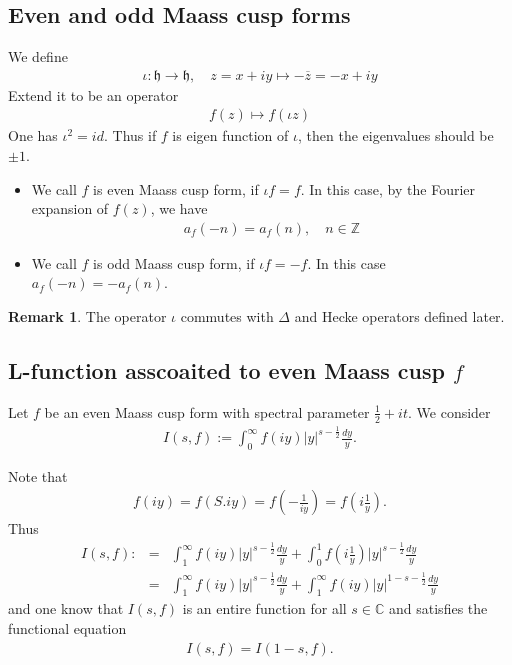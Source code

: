 \documentclass[11pt,reqno]{amsart}
\newcommand{\bna}{\begin{eqnarray*}}
\newcommand{\ena}{\end{eqnarray*}}
\newcommand{\mk}{\mathfrak}
\def\C{\mathbb{C}}
\def\Z{\mathbb{Z}}
\theoremstyle{definition}
\newtheorem{remark}{Remark}
\newcommand{\bit}{\begin{itemize}}
\newcommand{\eit}{\end{itemize}}
\begin{document}
\subsection{Even and odd Maass cusp forms}
We define
\bna
\iota:\mk h\rightarrow \mk  h,\quad z=x+iy\mapsto -\overline{z}=-x+iy
\ena
Extend it to be an operator
\bna
f(z)\mapsto f(\iota z)
\ena
One has $\iota^2=id$. Thus if $f$ is eigen function of $\iota$, then the eigenvalues
should be $\pm 1$.
\bit
\item We call $f$ is even Maass cusp form, if $\iota f=f$.
In this case, by the Fourier expansion of $f(z)$, we have
\bna
a_f(-n)=a_f(n),\quad n\in \Z
\ena
\item We call $f$ is odd Maass cusp form, if $\iota f=-f$.
In this case $a_f(-n)=-a_f(n)$.
\eit
\begin{remark}
The operator $\iota$ commutes with $\Delta$ and Hecke operators defined later.
\end{remark}
\subsection{L-function asscoaited to even Maass cusp $f$}
Let $f$ be an even Maass cusp form with spectral parameter $\frac{1}{2}+it$.
We consider
\bna
I(s,f):=\int_0^\infty f(iy)|y|^{s-\frac{1}{2}}\frac{dy}{y}.
 \ena

 Note that
\bna
f(iy)=f(S.iy)=f\left(-\frac{1}{iy}\right)=f(i\frac{1}{y}).
\ena
Thus
\bna
I(s,f):&=&\int_{1}^\infty f(iy)|y|^{s-\frac{1}{2}}\frac{dy}{y}
+\int_{0}^1f(i\frac{1}{y})|y|^{s-\frac{1}{2}}\frac{dy}{y}\\
&=&\int_{1}^\infty f(iy)|y|^{s-\frac{1}{2}}\frac{dy}{y}
+\int_{1}^\infty f(iy)|y|^{1-s-\frac{1}{2}}\frac{dy}{y}
\ena
and one know that $I(s,f)$ is an entire function for all
$s\in\C$ and satisfies the functional equation
\bna
I(s,f)=I(1-s,f).
\ena
\end{document}

